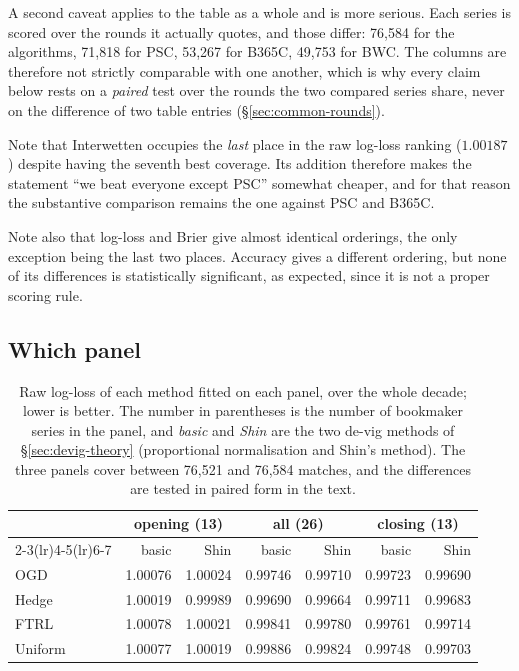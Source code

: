 \documentclass[12pt,a4paper,oneside]{report}
\renewcommand{\_}{\oldunderscore\allowbreak}
\theoremstyle{definition}
\theoremstyle{plain}
\theoremstyle{definition}   %
\begin{document}
A second caveat applies to the table as a whole and is more serious. Each series is scored over
the rounds it actually quotes, and those differ: 76,584 for the algorithms, 71,818 for PSC,
53,267 for B365C, 49,753 for BWC. The columns are therefore not strictly comparable with one
another, which is why every claim below rests on a \emph{paired} test over the rounds the two
compared series share, never on the difference of two table entries
(\S\ref{sec:common-rounds}).

Note that Interwetten occupies the \emph{last} place in the raw log-loss ranking ($1.00187$)
despite having the seventh best coverage. Its addition therefore makes the statement ``we beat
everyone except PSC'' somewhat cheaper, and for that reason the substantive comparison remains
the one against PSC and B365C.

Note also that log-loss and Brier give almost identical orderings, the only exception being the
last two places. Accuracy gives a different ordering, but none of its differences is statistically
significant, as expected, since it is not a proper scoring rule.

\subsection{Which panel}
\label{sec:res-panels}

\begin{table}[H]
\centering
\small
\begin{tabular}{@{}lrrrrrr@{}}
\toprule
& \multicolumn{2}{c}{\textbf{opening} (13)} & \multicolumn{2}{c}{\textbf{all} (26)} & \multicolumn{2}{c}{\textbf{closing} (13)} \\
\cmidrule(lr){2-3}\cmidrule(lr){4-5}\cmidrule(lr){6-7}
& basic & Shin & basic & Shin & basic & Shin \\
\midrule
OGD     & 1.00076 & 1.00024 & 0.99746 & 0.99710 & 0.99723 & 0.99690 \\
Hedge   & 1.00019 & 0.99989 & 0.99690 & 0.99664 & 0.99711 & 0.99683 \\
FTRL    & 1.00078 & 1.00021 & 0.99841 & 0.99780 & 0.99761 & 0.99714 \\
Uniform & 1.00077 & 1.00019 & 0.99886 & 0.99824 & 0.99748 & 0.99703 \\
\bottomrule
\end{tabular}
\caption{Raw log-loss of each method fitted on each panel, over the whole decade; lower is
better. The number in parentheses is the number of bookmaker series in the panel, and
\emph{basic} and \emph{Shin} are the two de-vig methods of \S\ref{sec:devig-theory}
(proportional normalisation and Shin's method). The three panels cover between 76,521 and
76,584 matches, and the differences are tested in paired form in the text.}
\label{tab:panels}
\end{table}
\end{document}
